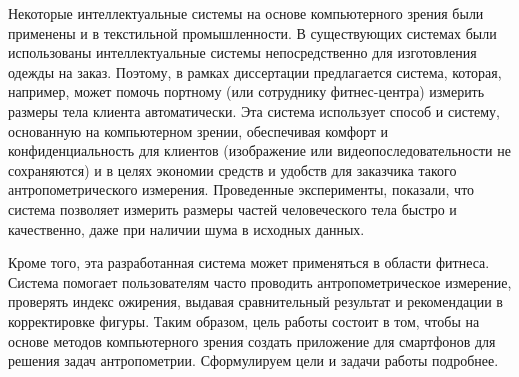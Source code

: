 Некоторые интеллектуальные системы на основе компьютерного зрения были применены и в текстильной промышленности. В существующих системах были использованы интеллектуальные системы непосредственно для изготовления одежды на заказ. Поэтому, в рамках диссертации предлагается система, которая, например, может помочь портному (или сотруднику фитнес-центра) измерить размеры тела клиента автоматически. Эта система использует способ и систему, основанную на  компьютерном зрении, обеспечивая комфорт и конфиденциальность для клиентов (изображение или видеопоследовательности не сохраняются) и в целях экономии средств и удобств для заказчика такого антропометрического измерения. Проведенные эксперименты, показали, что система позволяет измерить размеры частей человеческого тела быстро и качественно, даже при наличии шума в исходных данных.

Кроме того, эта разработанная система может применяться в области фитнеса. Система помогает пользователям часто проводить антропометрическое измерение, проверять индекс ожирения, выдавая сравнительный результат и рекомендации в корректировке фигуры. Таким образом, цель работы состоит в том, чтобы на основе методов компьютерного зрения создать приложение для смартфонов для решения задач антропометрии. Сформулируем цели и задачи работы подробнее.